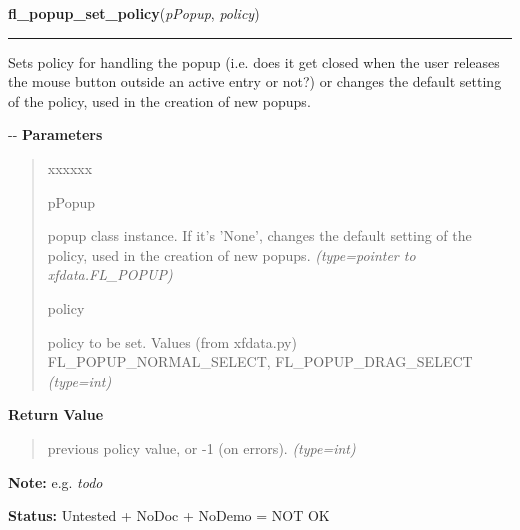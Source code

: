 \hspace{.8\funcindent}\begin{boxedminipage}{\funcwidth}

    \raggedright \textbf{fl\_popup\_set\_policy}(\textit{pPopup}, \textit{policy})

    \vspace{-1.5ex}

    \rule{\textwidth}{0.5\fboxrule}
\setlength{\parskip}{2ex}

Sets policy for handling the popup (i.e. does it get closed when the
user releases the mouse button outside an active entry or not?) or changes
the default setting of the policy, used in the creation of new popups.

-{}-
\setlength{\parskip}{1ex}
      \textbf{Parameters}
      \vspace{-1ex}

      \begin{quote}
        \begin{Ventry}{xxxxxx}

          \item[pPopup]


popup class instance. If it's 'None', changes the default setting of
the policy, used in the creation of new popups.
            {\it (type=pointer to xfdata.FL\_POPUP)}

          \item[policy]


policy to be set. Values (from xfdata.py) FL\_POPUP\_NORMAL\_SELECT,
FL\_POPUP\_DRAG\_SELECT
            {\it (type=int)}

        \end{Ventry}

      \end{quote}

      \textbf{Return Value}
    \vspace{-1ex}

      \begin{quote}

previous policy value, or -1 (on errors).
      {\it (type=int)}

      \end{quote}

\textbf{Note:} 
e.g. \emph{todo}


\textbf{Status:} 
Untested + NoDoc + NoDemo = NOT OK


    \end{boxedminipage}

    \label{xformslib:flpopup:fl_popup_set_callback}

